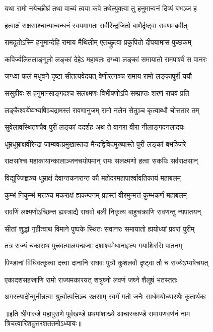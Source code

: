 \twolineshloka
{यथा रामो नयेच्छीघ्रं तथा वाच्यं त्वया कपे}
{तथेत्युक्त्वा तु हनुमान्वनं दिव्यं बभञ्ज ह} %

\twolineshloka
{हत्वाक्षं राक्षसांश्चान्यान्बन्धनं स्वयमागतः}
{सर्वैरिन्द्रजितो बाणैर्दृष्ट्वा रावणमब्रवीत्} %

\twolineshloka
{रामदूतोऽस्मि हनुमान्देहि रामाय मैथिलीम्}
{एतच्छ्रुत्वा प्रकुपितो दीपयामास पुच्छकम्} %

\twolineshloka
{कपिर्ज्वलितलाङ्गूलो लङ्कां देहेऽ महाबलः}
{दग्ध्वा लङ्कां समायातो रामपार्श्वं स वानरः} %

\twolineshloka
{जग्ध्वा फलं मधुवने दृष्टा सीतत्यवेदयत्}
{वेणीरत्नञ्च रामाय रामो लङ्कापुर्री ययौ} %

\twolineshloka
{ससुग्रीवः स हनुमान्साङ्गदश्च सलक्ष्मणः}
{विभीषणोऽपि सम्प्राप्तः शरणं राघवं प्रति} %

\twolineshloka
{लङ्कैश्वर्येष्वभ्यषिञ्चद्रामस्तं रावणानुजम्}
{रामो नलेन सेतुञ्च कृत्वाब्धौ चोत्ततार तम्} %

\twolineshloka
{सुवेलावस्थितश्चैव पुरीं लङ्कां ददर्शह}
{अथ ते वानरा वीरा नीलाङ्गदनलादयः} %

\twolineshloka
{धूम्रधूम्राक्षवीरेन्द्रा जाम्बवत्प्रमुखास्तदा}
{मैन्दद्विविदमुख्यास्ते पुरीं लङ्कां बभञ्जिरे} %

\twolineshloka
{राक्षसांश्च महाकायान्कालाञ्जनचयोपमान्}
{रामः सलक्ष्मणो हत्वा सकपिः सर्वराक्षसान्} %

\twolineshloka
{विद्युज्जिह्वञ्च धूम्राक्षं देवान्तकनरान्त कौ}
{महोदरमहापार्श्वावतिकायं महाबलम्} %

\twolineshloka
{कुम्भं निकुम्भं मत्तञ्च मकराक्षं ह्यकम्पनम्}
{प्रहस्तं वीरमुन्मत्तं कुम्भकर्णं महाबलम्} %

\twolineshloka
{रावणिं लक्ष्मणोऽच्छिन्त ह्यस्त्राद्यै राघवो बली}
{निकृत्य बाहुचक्राणि रावणन्तु न्यपातयन्} %

\twolineshloka
{सीतां शुद्धां गृहीत्वाथ विमाने पुष्पके स्थितः}
{सवानरः समायातो ह्ययोध्यां प्रवरां पुरीम्} %

\twolineshloka
{तत्र राज्यं चकाराथ पुत्त्रवत्पालयन्प्रजाः}
{दशाश्वमेधानाहृत्य गयाशिरसि पातनम्} %

\twolineshloka
{पिण्डानां विधिवत्कृत्वा दत्त्वा दानानि राघवः}
{पुत्रौ कुशलवौ दृष्ट्वा तौ च राज्येऽभ्यषेचयत्} %

\twolineshloka
{एकादशसहस्राणि रामो राज्यमकारयत्}
{शत्रुघ्नो लवणं जघ्ने शैलूषं भतस्ततः} %

\twolineshloka
{अगस्त्यादीन्मुनीन्नत्वा श्रुत्वोत्पत्तिञ्च रक्षसाम्}
{स्वर्गं गतो जनैः सार्धमयोध्यास्थैः कृतार्थकः} %

॥इति श्रीगारुडे महापुराणे पूर्वखण्डे प्रथमांशाख्ये आचारकाण्डे रामायणवर्णनं नाम
त्रिचत्वारिंशदुत्तरशततमोऽध्यायः॥